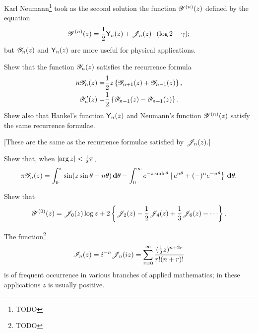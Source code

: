 Karl Neumann\footnote{TODO} took as the second solution the function
$\mathscr{Y}^{(n)}(z)$ defined by the equation
$$
\mathscr{Y}^{(n)}(z)
=
\frac{1}{2} \mathsf{Y}_{n}(z) + \mathscr{J}_{n}(z) \cdot (\log 2 - \gamma);
$$
but $\mathscr{Y}_{n}(z)$ and $\mathsf{Y}_{n}(z)$ are more useful for physical
applications.
\begin{wandwexample}
  Shew that the function $\mathscr{Y}_{n}(z)$ satisfies the recurrence formula
  \begin{align*}
    n \mathscr{Y}_{n}(z)
    =& \frac{1}{2} z \left\{  \mathscr{Y}_{n+1}(z) + \mathscr{Y}_{n-1}(z) \right\},
    \\
    \mathscr{Y}_{n}'(z)
    =& \frac{1}{2} \left\{  \mathscr{Y}_{n-1}(z) - \mathscr{Y}_{n+1}(z)   \right\}.
  \end{align*}
  Shew also that Hankel's function $\mathsf{Y}_{n}(z)$ and Neumann's
  function $\mathscr{Y}^{(n)}(z)$ satisfy the same recurrence formulae.

  [These are the same as the recurrence formulae satisfied by $\mathscr{J}_{n}(z)$.]
\end{wandwexample}
\begin{wandwexample}
  Shew that, when $\left| \arg z \right| < \frac{1}{2} \pi$,
  $$
  \pi \mathscr{Y}_{n}(z)
  =
  \int_{0}^{\pi}
  \sin (z \sin\theta - n\theta) \, \mathbf{d} \theta
  -
  \int_{0}^{\infty}
  e^{-z \sinh\theta} \left\{ e^{n\theta} + (-)^{n} e^{-n\theta} \right\} \, \mathbf{d}\theta.
  $$
\end{wandwexample}
\begin{wandwexample}
  Shew that
  $$
  \besY^{(0)}(z)
  =
  \besJ_{0}(z) \log z
  + 2 \thebrace{ \besJ_{2}(z) - \half \besJ_{4}(z) + \frac{1}{3} \besJ_{6}(z) - \cdots  }.
  $$
\end{wandwexample}

The function\footnote{TODO}
$$
\mathscr{I}_{n}(z)
=
i^{-n}
\mathscr{J}_{n}(iz)
=
\sum_{r=0}^{\infty}
\frac{(\frac{1}{2} z)^{n+2r}}{r!(n+r)!}
$$
% 
% 
is of frequent occurrence in various branches of applied
mathematics; in these applications $z$ is usually positive.

